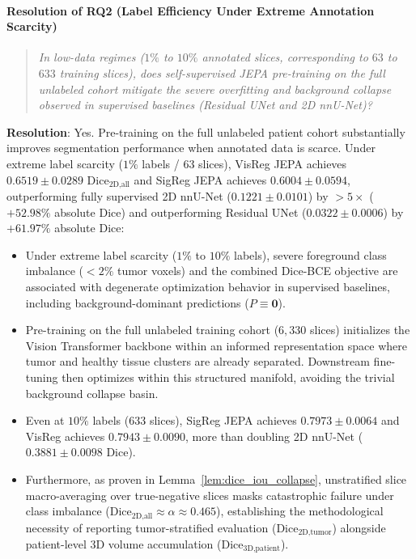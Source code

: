 \documentclass{article}
\begin{document}
\paragraph{Resolution of RQ2 (Label Efficiency Under Extreme Annotation Scarcity)}
\begin{quote}
\emph{In low-data regimes ($1\%$ to $10\%$ annotated slices, corresponding to $63$ to $633$ training slices), does self-supervised JEPA pre-training on the full unlabeled cohort mitigate the severe overfitting and background collapse observed in supervised baselines (Residual UNet and 2D nnU-Net)?}
\end{quote}
\textbf{Resolution}: Yes. Pre-training on the full unlabeled patient cohort substantially improves segmentation performance when annotated data is scarce. Under extreme label scarcity ($1\%$ labels / $63$ slices), VisReg JEPA achieves $\mathbf{0.6519 \pm 0.0289}$ $\text{Dice}_{\text{2D,all}}$ and SigReg JEPA achieves $0.6004 \pm 0.0594$, outperforming fully supervised 2D nnU-Net ($0.1221 \pm 0.0101$) by $>5\times$ ($+52.98\%$ absolute Dice) and outperforming Residual UNet ($0.0322 \pm 0.0006$) by $+61.97\%$ absolute Dice:
\begin{itemize}
    \item Under extreme label scarcity ($1\%$ to $10\%$ labels), severe foreground class imbalance ($< 2\%$ tumor voxels) and the combined Dice-BCE objective are associated with degenerate optimization behavior in supervised baselines, including background-dominant predictions ($P \equiv \mathbf{0}$).
    \item Pre-training on the full unlabeled training cohort ($6,330$ slices) initializes the Vision Transformer backbone within an informed representation space where tumor and healthy tissue clusters are already separated. Downstream fine-tuning then optimizes within this structured manifold, avoiding the trivial background collapse basin.
    \item Even at $10\%$ labels ($633$ slices), SigReg JEPA achieves $0.7973 \pm 0.0064$ and VisReg achieves $0.7943 \pm 0.0090$, more than doubling 2D nnU-Net ($0.3881 \pm 0.0098$ Dice).
    \item Furthermore, as proven in Lemma~\ref{lem:dice_iou_collapse}, unstratified slice macro-averaging over true-negative slices masks catastrophic failure under class imbalance ($\text{Dice}_{\text{2D,all}} \approx \alpha \approx 0.465$), establishing the methodological necessity of reporting tumor-stratified evaluation ($\text{Dice}_{\text{2D,tumor}}$) alongside patient-level 3D volume accumulation ($\text{Dice}_{\text{3D,patient}}$).
\end{itemize}
\end{document}
